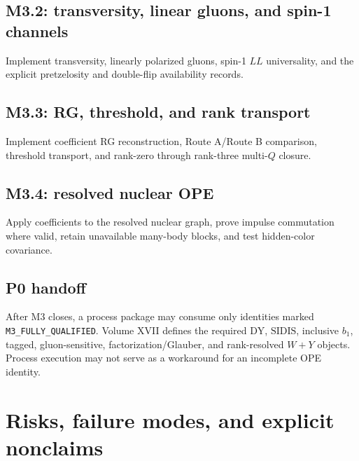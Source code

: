 \documentclass[11pt]{article}
\newcommand{\DY}{\mathrm{DY}}
\newcommand{\SIDIS}{\mathrm{SIDIS}}
\begin{document}
\subsection{M3.2: transversity, linear gluons, and spin-1 channels}

Implement transversity, linearly polarized gluons, spin-1 \(LL\) universality, and the explicit pretzelosity and double-flip availability records.

\subsection{M3.3: RG, threshold, and rank transport}

Implement coefficient RG reconstruction, Route A/Route B comparison, threshold transport, and rank-zero through rank-three multi-\(Q\) closure.

\subsection{M3.4: resolved nuclear OPE}

Apply coefficients to the resolved nuclear graph, prove impulse commutation where valid, retain unavailable many-body blocks, and test hidden-color covariance.

\subsection{P0 handoff}

After M3 closes, a process package may consume only identities marked \texttt{M3\_FULLY\_\allowbreak QUALIFIED}.  Volume XVII defines the required \(\DY\), \(\SIDIS\), inclusive \(b_1\), tagged, gluon-sensitive, factorization/Glauber, and rank-resolved \(W+Y\) objects.  Process execution may not serve as a workaround for an incomplete OPE identity.

\section{Risks, failure modes, and explicit nonclaims}
\label{sec:risks}
\end{document}
